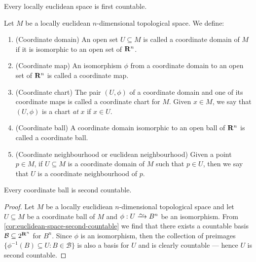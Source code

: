 \begin{proposition}
\label{prop:locally-euclidean-first-countable}
Every locally euclidean space is first countable.
\end{proposition}


\begin{definition}[Miscelaneous]
Let \(M\) be a locally euclidean \(n\)-dimensional topological space. We
define:
\begin{enumerate}[(C1)]
  \item\label{def: coordinate domain}
    (Coordinate domain) An open set \(U \subseteq M\) is called a coordinate
    domain of \(M\) if it is isomorphic to an open set of \(\mathbf{R}^n\).
  \item\label{def: coordinate map}
    (Coordinate map) An isomorphism \(\phi\) from a coordinate domain to an
    open set of \(\mathbf{R}^n\) is called a coordinate map.
  \item\label{def: coordinate chart}
    (Coordinate chart) The pair \((U, \phi)\) of a coordinate domain and one
    of its coordinate maps is called a coordinate chart for \(M\). Given \(x \in
    M\), we say that \((U, \phi)\) is a chart \emph{at} \(x\) if \(x \in U\).
  \item\label{def: coordinate ball}
    (Coordinate ball) A coordinate domain isomorphic to an open ball of
    \(\mathbf{R}^n\) is called a coordinate ball.
  \item\label{def: euclidean neighbourhood}
    (Coordinate neighbourhood or euclidean neighbourhood) Given a point \(p
    \in M\), if \(U \subseteq M\) is a coordinate domain of \(M\) such that
    \(p \in U\), then we say that \(U\) is a coordinate neighbourhood of
    \(p\).
\end{enumerate}
\end{definition}

\begin{proposition}
\label{prop:coordinate-ball-second-countable}
Every coordinate ball is second countable.
\end{proposition}

\begin{proof}
Let \(M\) be a locally euclidiean \(n\)-dimensional topological space and let
\(U \subseteq M\) be a coordinate ball of \(M\) and \(\phi: U \isoto B^n\) be an
isomorphism. From \cref{cor:euclidean-space-second-countable} we find that there
exists a countable basis \(\mathcal B \subseteq 2^{\mathbf{R}^n}\) for \(B^n\). Since
\(\phi\) is an isomorphism, then the collection of preimages \(\{\phi^{-1}(B)
\subseteq U \colon B \in \mathcal B\}\) is also a basis for \(U\) and is clearly
countable --- hence \(U\) is second countable.
\end{proof}

